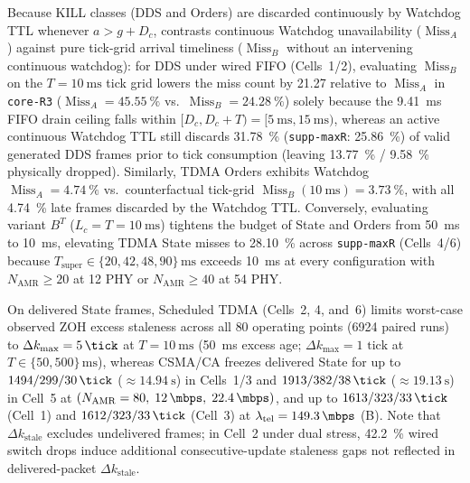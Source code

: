 \documentclass[11pt,a4paper]{article}
\newcommand{\Namr}{\ensuremath{N_{\mathrm{AMR}}}}
\newcommand{\ltel}{\ensuremath{\lambda_{\mathrm{tel}}}}
\newcommand{\Tsuper}{\ensuremath{T_{\mathrm{super}}}}
\newcommand{\MissA}{\ensuremath{\operatorname{Miss}_A}}
\newcommand{\MissB}{\ensuremath{\operatorname{Miss}_B}}
\begin{document}
Because KILL classes (DDS and Orders) are discarded continuously by Watchdog TTL whenever $a > g + D_c$,  contrasts continuous Watchdog unavailability ($\MissA$) against pure tick-grid arrival timeliness ($\MissB$ without an intervening continuous watchdog): for DDS under wired FIFO (Cells~1/2), evaluating $\MissB$ on the $T = \qty{10}{\milli\second}$ tick grid lowers the miss count by \qty{21.27}{\pp} relative to $\MissA$ in \texttt{core-R3} ($\MissA = \qty{45.55}{\percent}$ vs.\ $\MissB = \qty{24.28}{\percent}$) solely because the \qty{9.41}{\milli\second} FIFO drain ceiling falls within $[D_c, D_c + T) = [\qty{5}{\milli\second}, \qty{15}{\milli\second})$, whereas an active continuous Watchdog TTL still discards \qty{31.78}{\percent} (\texttt{supp-maxR}: \qty{25.86}{\percent}) of valid generated DDS frames prior to tick consumption (leaving \qty{13.77}{\percent} / \qty{9.58}{\percent} physically dropped). Similarly, TDMA Orders exhibits Watchdog $\MissA = \qty{4.74}{\percent}$ vs.\ counterfactual tick-grid $\MissB(\qty{10}{\milli\second}) = \qty{3.73}{\percent}$, with all \qty{4.74}{\percent} late frames discarded by the Watchdog TTL. Conversely, evaluating variant $B^T$ ($L_c = T = \qty{10}{\milli\second}$) tightens the budget of State and Orders from \qty{50}{\milli\second} to \qty{10}{\milli\second}, elevating TDMA State misses to \qty{28.10}{\percent} across \texttt{supp-maxR} (Cells~4/6) because $\Tsuper \in \{20, 42, 48, 90\}\,\text{ms}$ exceeds \qty{10}{\milli\second} at every configuration with $\Namr \ge 20$ at \qty{12}{\mbps} PHY or $\Namr \ge 40$ at \qty{54}{\mbps} PHY.

On delivered State frames, Scheduled TDMA (Cells~2, 4, and~6) limits worst-case observed ZOH excess staleness across all $80$ operating points (\num{6924} paired runs) to $\Delta k_{\max} = \qty{5}{\tick}$ at $T=\qty{10}{\milli\second}$ (\qty{50}{\milli\second} excess age; $\Delta k_{\max} = 1\text{ tick}$ at $T \in \{50, 500\}\,\text{ms}$), whereas CSMA/CA freezes delivered State for up to $\num{1494} / 299 / \qty{30}{\tick}$ ($\approx \qty{14.94}{\second}$) in Cells~1/3 and $\num{1913} / 382 / \qty{38}{\tick}$ ($\approx \qty{19.13}{\second}$) in Cell~5 at $(\Namr=80,\; \qty{12}{\mbps},\; \qty{22.4}{\mbps})$, and up to $\num{1613} / 323 / \qty{33}{\tick}$ (Cell~1) and $\num{1612} / 323 / \qty{33}{\tick}$ (Cell~3) at $\ltel = \qty{149.3}{\mbps}$ (B). Note that $\Delta k_{\mathrm{stale}}$ excludes undelivered frames; in Cell~2 under dual stress, \qty{42.2}{\percent} wired switch drops induce additional consecutive-update staleness gaps not reflected in delivered-packet $\Delta k_{\mathrm{stale}}$.
\end{document}
